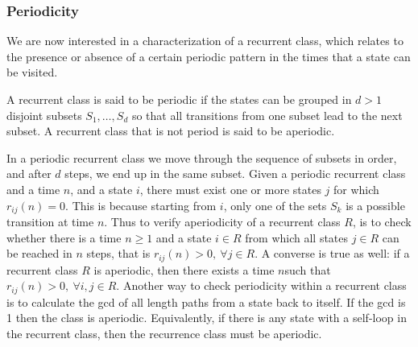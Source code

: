 \documentclass[11pt]{scrartcl}
\begin{document}
\subsubsection{Periodicity}
We are now interested in a characterization of a recurrent class, which relates
to the presence or absence of a certain periodic pattern in the times that
a state can be visited. 
\begin{definition}[periodic]
  A recurrent class is said to be periodic if the states can be grouped in
  $d>1$ disjoint subsets $S_1,\ldots,S_{d}$ so that  all transitions from one
  subset lead to the next subset. A recurrent class that is not period is said
  to be aperiodic.
\end{definition}
In a periodic recurrent class we move through the sequence of subsets in order,
and after $d$ steps, we end up in the same subset. Given a periodic recurrent
class and a time $n$, and a state $i$, there must exist one or more states $j$
for which $r_{ij}(n)=0$. This is because starting from $i$, only one of the
sets $S_{k}$ is a possible transition at time $n$. Thus to verify aperiodicity
of a recurrent class $R$, is to check whether there is a time $n\geq 1$ and
a state $i\in R$ from which all states $j \in R$ can be reached in $n$ steps, that
is $r_{ij}(n)>0, ~\forall j\in R$. A converse is true as well: if a recurrent
class $R$ is aperiodic, then there exists a time $n$such that $r_{ij}(n) >0,
~\forall i,j \in R$. Another way to check periodicity within a recurrent class
is to calculate the gcd of all length paths from a state back to itself. If the
gcd is 1 then the class is aperiodic. Equivalently, if there is any state with
a self-loop in the recurrent class, then the recurrence class must be
aperiodic.
\end{document}
